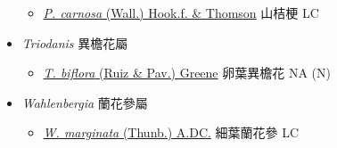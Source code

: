 \begin{itemize}
  \begin{itemize}
        \item[] \href{http://www.theplantlist.org/tpl1.1/search?q=Peracarpa+carnosa}{\textit{P. carnosa} (Wall.) Hook.f. \& Thomson}   山桔梗   LC
  \end{itemize}
 \item[] \textit{Triodanis} 異檐花屬
                                
  \begin{itemize}
        \item[] \href{http://www.theplantlist.org/tpl1.1/search?q=Triodanis+biflora}{\textit{T. biflora} (Ruiz \& Pav.) Greene}   卵葉異檐花   NA (N)
  \end{itemize}
 \item[] \textit{Wahlenbergia} 蘭花參屬
                                
  \begin{itemize}
        \item[] \href{http://www.theplantlist.org/tpl1.1/search?q=Wahlenbergia+marginata}{\textit{W. marginata} (Thunb.) A.DC.}   細葉蘭花參   LC
  \end{itemize}
  \end{itemize}
